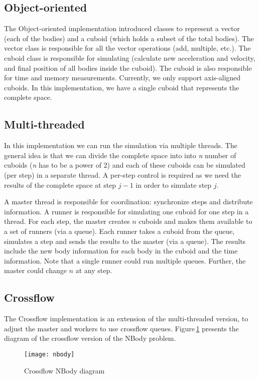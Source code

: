 \documentclass[11pt,a4paper]{article}
\begin{document}
\subsection{Object-oriented}
The Object-oriented implementation introduced classes to represent a vector (each of the bodies) and a cuboid (which holds a subset of the total bodies).
The vector class is responsible for all the vector operations (add, multiple, etc.).
The cuboid class is responsible for simulating (calculate new acceleration and velocity, and final position of all bodies inside the cuboid).
The cuboid is also responsible for time and memory measurements.
Currently, we only support axis-aligned cuboids.
In this implementation, we have a single cuboid that represents the complete space.

\subsection{Multi-threaded}
In this implementation we can run the simulation via multiple threads.
The general idea is that we can divide the complete space into into \emph{n} number of cuboids (\emph{n} has to be a power of 2) and each of these cuboids can be simulated (per step) in a separate thread.
A per-step control is required as we need the results of the complete space at step $j-1$ in order to simulate step $j$.

A master thread is responsible for coordination: synchronize steps and distribute information.
A runner is responsible for simulating one cuboid for one step in a thread.
For each step, the master creates $n$ cuboids and makes them available to a set of runners (via a queue).
Each runner takes a cuboid from the queue, simulates a step and sends the results to the master (via a queue).
The results include the new body information for each body in the cuboid and the time information.
Note that a single runner could run multiple queues.
Further, the master could change $n$ at any step.

\subsection{Crossflow}
The Crossflow implementation is an extension of the multi-threaded version, to adjust the master and workers to use crossflow queues.
Figure\,\ref{fig:nbody} presents the diagram of the crossflow version of the NBody problem.

\begin{figure}
    \centering
    \texttt{[image: nbody]}
    \caption{Crossflow NBody diagram}
    \label{fig:nbody}
\end{figure}
\end{document}
